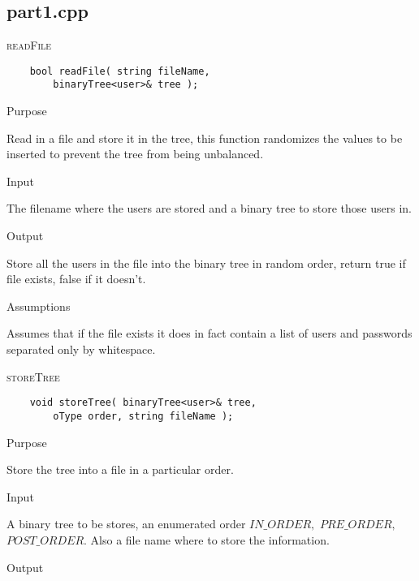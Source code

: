 \documentclass[pdftex, 12pt]{article}
\begin{document}
\subsection{part1.cpp}
\begin{description}

	\item{\textsc{readFile}}
\begin{lstlisting}
	bool readFile( string fileName,
		binaryTree<user>& tree );
\end{lstlisting}
		\begin{description}

			\item{Purpose}

				Read in a file and store it in the tree, this function randomizes the values to be inserted to prevent
				the tree from being unbalanced.

			\item{Input}

				The filename where the users are stored and a binary tree to store those users in.

			\item{Output}

				Store all the users in the file into the binary tree in random order, return true if file exists, false
				if it doesn't.

			\item{Assumptions}

				Assumes that if the file exists it does in fact contain a list of users and passwords separated only by
				whitespace.

		\end{description}
	\item{\textsc{storeTree}}
\begin{lstlisting}
	void storeTree( binaryTree<user>& tree,
		oType order, string fileName );
\end{lstlisting}
		\begin{description}

			\item{Purpose}

				Store the tree into a file in a particular order.

			\item{Input}

				A binary tree to be stores, an enumerated order
				$IN\_ORDER,$ 
				$PRE\_ORDER,$
				$POST\_ORDER$. Also a file name
				where to store the information.

			\item{Output}


\end{description}
\end{description}
\end{document}
